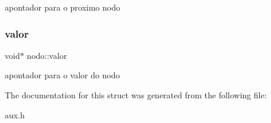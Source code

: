 apontador para o proximo nodo \mbox{\label{structnodo_ab63adcdb83ea1fdcf4fa10f3cafc4a6a}} 
\subsubsection{\texorpdfstring{valor}{valor}}
{\footnotesize\ttfamily void$\ast$ nodo\+::valor}

apontador para o valor do nodo 

The documentation for this struct was generated from the following file\+:\begin{DoxyCompactItemize}
\item 
aux.\+h\end{DoxyCompactItemize}

